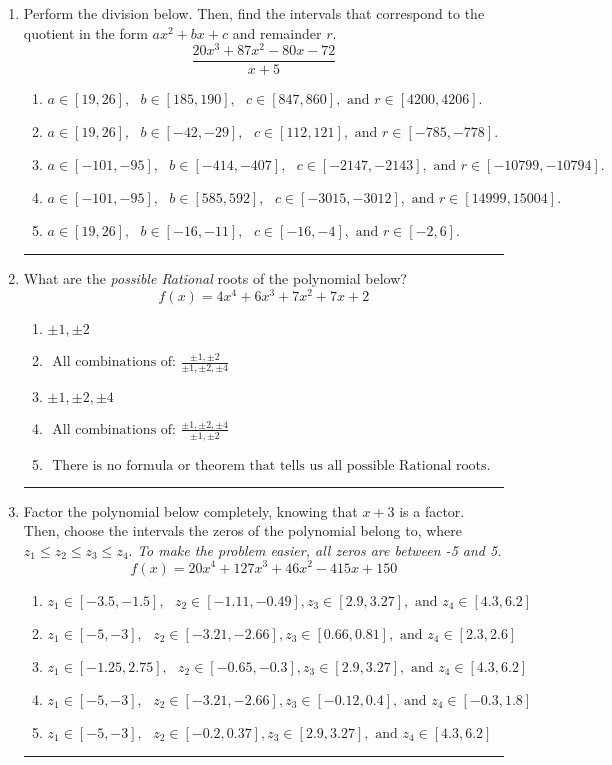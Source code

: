 \documentclass[14pt]{extbook}
\newcommand{\litem}[1]{\item#1\hspace*{-1cm}\rule{\textwidth}{0.4pt}}
\begin{document}
\begin{enumerate}
\litem{
Perform the division below. Then, find the intervals that correspond to the quotient in the form $ax^2+bx+c$ and remainder $r$.\[ \frac{20x^{3} +87 x^{2} -80 x -72}{x + 5} \]\begin{enumerate}[label=\Alph*.]
\item \( a \in [19, 26], \text{   } b \in [185, 190], \text{   } c \in [847, 860], \text{   and   } r \in [4200, 4206]. \)
\item \( a \in [19, 26], \text{   } b \in [-42, -29], \text{   } c \in [112, 121], \text{   and   } r \in [-785, -778]. \)
\item \( a \in [-101, -95], \text{   } b \in [-414, -407], \text{   } c \in [-2147, -2143], \text{   and   } r \in [-10799, -10794]. \)
\item \( a \in [-101, -95], \text{   } b \in [585, 592], \text{   } c \in [-3015, -3012], \text{   and   } r \in [14999, 15004]. \)
\item \( a \in [19, 26], \text{   } b \in [-16, -11], \text{   } c \in [-16, -4], \text{   and   } r \in [-2, 6]. \)

\end{enumerate} }
\litem{
What are the \textit{possible Rational} roots of the polynomial below?\[ f(x) = 4x^{4} +6 x^{3} +7 x^{2} +7 x + 2 \]\begin{enumerate}[label=\Alph*.]
\item \( \pm 1,\pm 2 \)
\item \( \text{ All combinations of: }\frac{\pm 1,\pm 2}{\pm 1,\pm 2,\pm 4} \)
\item \( \pm 1,\pm 2,\pm 4 \)
\item \( \text{ All combinations of: }\frac{\pm 1,\pm 2,\pm 4}{\pm 1,\pm 2} \)
\item \( \text{ There is no formula or theorem that tells us all possible Rational roots.} \)

\end{enumerate} }
\litem{
Factor the polynomial below completely, knowing that $x+3$ is a factor. Then, choose the intervals the zeros of the polynomial belong to, where $z_1 \leq z_2 \leq z_3 \leq z_4$. \textit{To make the problem easier, all zeros are between -5 and 5.}\[ f(x) = 20x^{4} +127 x^{3} +46 x^{2} -415 x + 150 \]\begin{enumerate}[label=\Alph*.]
\item \( z_1 \in [-3.5, -1.5], \text{   }  z_2 \in [-1.11, -0.49], z_3 \in [2.9, 3.27], \text{   and   } z_4 \in [4.3, 6.2] \)
\item \( z_1 \in [-5, -3], \text{   }  z_2 \in [-3.21, -2.66], z_3 \in [0.66, 0.81], \text{   and   } z_4 \in [2.3, 2.6] \)
\item \( z_1 \in [-1.25, 2.75], \text{   }  z_2 \in [-0.65, -0.3], z_3 \in [2.9, 3.27], \text{   and   } z_4 \in [4.3, 6.2] \)
\item \( z_1 \in [-5, -3], \text{   }  z_2 \in [-3.21, -2.66], z_3 \in [-0.12, 0.4], \text{   and   } z_4 \in [-0.3, 1.8] \)
\item \( z_1 \in [-5, -3], \text{   }  z_2 \in [-0.2, 0.37], z_3 \in [2.9, 3.27], \text{   and   } z_4 \in [4.3, 6.2] \)


\end{enumerate}}
\end{enumerate}
\end{document}
